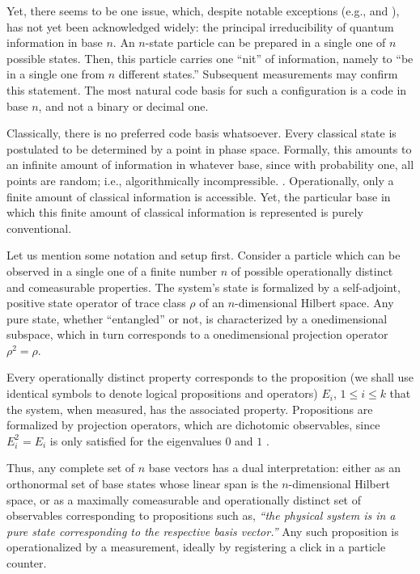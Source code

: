 Yet, there seems to be one issue,
which, despite notable exceptions (e.g., \cite[Footnote 6]{zeil-99} and
\cite{Muthukrishnan}),
has not yet been acknowledged widely:
the principal irreducibility of quantum information in base $n$.
An $n$-state particle  can be prepared in a single one of $n$ possible states.
Then, this particle carries one ``nit'' of information, namely to
``be in a single one from $n$ different states.''
Subsequent measurements may confirm this statement.
The most natural code basis for such a configuration is a code in base $n$,
and not a binary or decimal one.


Classically, there is no preferred code basis whatsoever.
Every classical state is postulated to be determined by a
point in phase space.
Formally, this amounts to an infinite amount of information in whatever base,
since
with probability one, all points are random; i.e., algorithmically incompressible.
\cite{chaitin2,calude:94}.
Operationally, only a finite amount of classical information is accessible.
Yet, the particular base in which this finite amount of classical information is represented
is purely conventional.


Let us mention some notation and setup first.
Consider a particle which can be observed in a single one of
a finite number
$n$ of possible operationally distinct and comeasurable properties.
The system's state is
formalized by a self-adjoint, positive
state operator  of trace class $\rho$ of an $n$-dimensional Hilbert space.
Any pure state, whether ``entangled'' or not,
is characterized by a onedimensional subspace, which in turn
corresponds to a onedimensional projection operator $\rho^2=\rho$.

Every  operationally distinct property corresponds to the proposition
(we shall use identical symbols to denote logical propositions and operators)
$E_i$, $1\le i\le k$ that the
system, when measured, has the associated property.
Propositions are formalized by projection operators,
which are dichotomic observables, since
$E_i^2=E_i$ is only satisfied for the eigenvalues $0$ and $1$
\cite{v-neumann-49}.

Thus, any complete set of $n$ base vectors has a dual interpretation:
either as an orthonormal set of base states
whose linear span is the $n$-dimensional Hilbert space,
or as a maximally comeasurable and operationally distinct set of observables
corresponding to propositions such as,
{\em ``the physical system is in a pure state corresponding to the respective basis vector.''}
Any such proposition is operationalized by a measurement, ideally by registering a
click in a particle counter.

